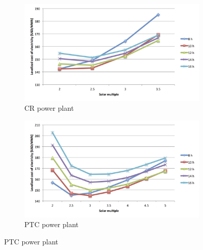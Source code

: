 \documentclass[Master,MEE,english]{twbook}%
\begin{document}
\pagebreak
\begin{figure}[p]
        \centering   
        \begin{subfigure}[b]{0.75\textwidth}
                \centering
                \includegraphics[width=1.05\textwidth]{FIG/CR_LCOE}
                \caption{CR power plant}\label{CR_LCOE}
        \end{subfigure}%
        
\par\medskip %
                
        \begin{subfigure}[b]{0.75\textwidth}
                \centering
                \includegraphics[width=1.05\textwidth]{FIG/PTC_LCOE}
                \caption{PTC power plant}\label{PTC_LCOE}
        \end{subfigure}%

\par\medskip %
                

\end{figure}
\end{document}
